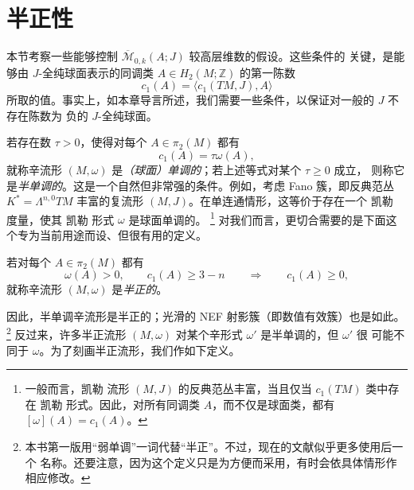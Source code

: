 
\section{半正性}\label{sec:6-4}

本节考察一些能够控制 $\overline{\mathcal M}_{0,k}(A;J)$ 较高层维数的假设。这些条件的
关键，是能够由 $J$-全纯球面表示的同调类 $A\in H_2(M;\mathbb Z)$ 的第一陈数
\[
  c_1(A)=\langle c_1(TM,J),A\rangle
\]
所取的值。事实上，如本章导言所述，我们需要一些条件，以保证对一般的 $J$ 不存在陈数为
负的 $J$-全纯球面。

若存在数 $\tau>0$，使得对每个 $A\in\pi_2(M)$ 都有
\[
  c_1(A)=\tau\omega(A),
\]
就称辛流形 $(M,\omega)$ 是\emph{（球面）单调的}；若上述等式对某个 $\tau\ge0$ 成立，
则称它是\emph{半单调的}。这是一个自然但非常强的条件。例如，考虑 Fano 簇，即反典范丛
$K^*=\Lambda^{n,0}TM$ 丰富的复流形 $(M,J)$。在单连通情形，这等价于存在一个 凯勒
度量，使其 凯勒 形式 $\omega$ 是球面单调的。
\footnote{一般而言，凯勒 流形 $(M,J)$ 的反典范丛丰富，当且仅当 $c_1(TM)$ 类中存在
凯勒 形式。因此，对所有同调类 $A$，而不仅是球面类，都有
$[\omega](A)=c_1(A)$。}
对我们而言，更切合需要的是下面这个专为当前用途而设、但很有用的定义。

\begin{definition}\label{def:6-4-1}
若对每个 $A\in\pi_2(M)$ 都有
\[
  \omega(A)>0,\qquad c_1(A)\ge3-n
  \qquad\Longrightarrow\qquad c_1(A)\ge0,
\]
就称辛流形 $(M,\omega)$ 是\emph{半正的}。
\end{definition}

因此，半单调辛流形是半正的；光滑的 NEF 射影簇（即数值有效簇）也是如此。
\footnote{本书第一版用“弱单调”一词代替“半正”。不过，现在的文献似乎更多使用后一个
名称。还要注意，因为这个定义只是为方便而采用，有时会依具体情形作相应修改。}
反过来，许多半正流形 $(M,\omega)$ 对某个辛形式 $\omega'$ 是半单调的，但 $\omega'$ 很
可能不同于 $\omega$。为了刻画半正流形，我们作如下定义。


